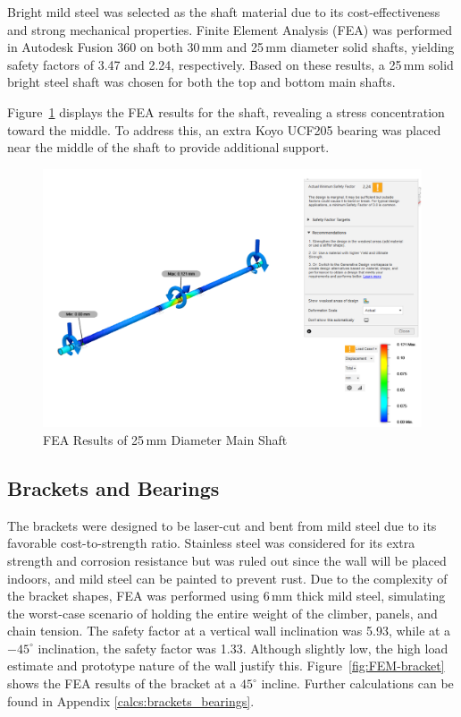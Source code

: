 Bright mild steel was selected as the shaft material due to its cost-effectiveness and strong mechanical properties. Finite Element Analysis (FEA) was performed in Autodesk Fusion 360 on both 30\,mm and 25\,mm diameter solid shafts, yielding safety factors of 3.47 and 2.24, respectively. Based on these results, a 25\,mm solid bright steel shaft was chosen for both the top and bottom main shafts.

Figure~\ref{fig:FEM-mainshaft} displays the FEA results for the shaft, revealing a stress concentration toward the middle. To address this, an extra Koyo UCF205 bearing was placed near the middle of the shaft to provide additional support.

\begin{figure}[h]
    \centering
    \includegraphics[width=0.8\linewidth]{figs/final_design/FEMShaft.png}
    \caption{FEA Results of 25\,mm Diameter Main Shaft}
    \label{fig:FEM-mainshaft}
\end{figure}

\subsection{Brackets and Bearings}

The brackets were designed to be laser-cut and bent from mild steel due to its favorable cost-to-strength ratio. Stainless steel was considered for its extra strength and corrosion resistance but was ruled out since the wall will be placed indoors, and mild steel can be painted to prevent rust. Due to the complexity of the bracket shapes, FEA was performed using 6\,mm thick mild steel, simulating the worst-case scenario of holding the entire weight of the climber, panels, and chain tension. The safety factor at a vertical wall inclination was 5.93, while at a $-45^\circ$ inclination, the safety factor was 1.33. Although slightly low, the high load estimate and prototype nature of the wall justify this. Figure~\ref{fig:FEM-bracket} shows the FEA results of the bracket at a $45^\circ$ incline. Further calculations can be found in Appendix \ref{calcs:brackets_bearings}.


